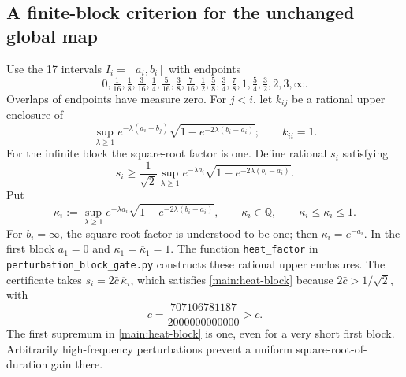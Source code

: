 \subsection{A finite-block criterion for the unchanged global map}
\label{main:blocks}

Use the 17 intervals $I_i=[a_i,b_i]$ with endpoints
\begin{equation}
 0,\tfrac1{16},\tfrac18,\tfrac3{16},\tfrac14,\tfrac5{16},
 \tfrac38,\tfrac7{16},\tfrac12,\tfrac58,\tfrac34,\tfrac78,
 1,\tfrac54,\tfrac32,2,3,\infty.\label{main:partition}
\end{equation}
Overlaps of endpoints have measure zero. For $j<i$, let $k_{ij}$ be a
rational upper enclosure of
\begin{equation}
 \sup_{\lambda\ge1}e^{-\lambda(a_i-b_j)}
          \sqrt{1-e^{-2\lambda(b_i-a_i)}};\qquad k_{ii}=1.
 \label{main:memory}
\end{equation}
For the infinite block the square-root factor is one. Define rational
$s_i$ satisfying
\begin{equation}
 s_i\ge\frac1{\sqrt2}\sup_{\lambda\ge1}e^{-\lambda a_i}
       \sqrt{1-e^{-2\lambda(b_i-a_i)}}.
 \label{main:heat-block}
\end{equation}
Put
\[
 \kappa_i:=\sup_{\lambda\ge1}e^{-\lambda a_i}
       \sqrt{1-e^{-2\lambda(b_i-a_i)}},
 \qquad \overline\kappa_i\in\mathbb Q,
 \qquad \kappa_i\le\overline\kappa_i\le1.
\]
For $b_i=\infty$, the square-root factor is understood to be one;
then $\kappa_i=e^{-a_i}$. In the first block $a_1=0$ and
$\kappa_1=\overline\kappa_1=1$. The function
\texttt{heat\_factor} in
\nolinkurl{perturbation_block_gate.py} constructs these rational upper
enclosures. The certificate takes $s_i=2\bar c\,\overline\kappa_i$,
which satisfies \eqref{main:heat-block} because
$2\bar c>1/\sqrt2$, with
\begin{equation}
 \bar c=\frac{707106781187}{2000000000000}>c.
 \label{main:cbar}
\end{equation}
The first supremum in \eqref{main:heat-block} is one, even for a very short
first block. Arbitrarily high-frequency perturbations prevent a uniform
square-root-of-duration gain there.

